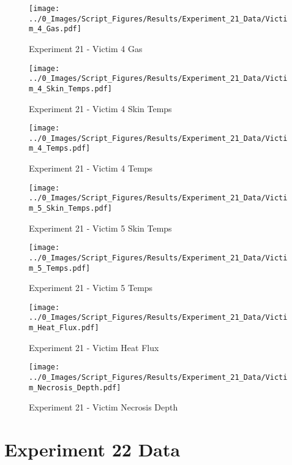 	\clearpage

	\begin{figure}[H]
		\centering
		\texttt{[image: ../0\_Images/Script\_Figures/Results/Experiment\_21\_Data/Victim\_4\_Gas.pdf]}
		\caption[]{Experiment 21 - Victim 4 Gas}
	\end{figure}
 

	\begin{figure}[H]
		\centering
		\texttt{[image: ../0\_Images/Script\_Figures/Results/Experiment\_21\_Data/Victim\_4\_Skin\_Temps.pdf]}
		\caption[]{Experiment 21 - Victim 4 Skin Temps}
	\end{figure}
 
	\clearpage

	\begin{figure}[H]
		\centering
		\texttt{[image: ../0\_Images/Script\_Figures/Results/Experiment\_21\_Data/Victim\_4\_Temps.pdf]}
		\caption[]{Experiment 21 - Victim 4 Temps}
	\end{figure}
 

	\begin{figure}[H]
		\centering
		\texttt{[image: ../0\_Images/Script\_Figures/Results/Experiment\_21\_Data/Victim\_5\_Skin\_Temps.pdf]}
		\caption[]{Experiment 21 - Victim 5 Skin Temps}
	\end{figure}
 
	\clearpage

	\begin{figure}[H]
		\centering
		\texttt{[image: ../0\_Images/Script\_Figures/Results/Experiment\_21\_Data/Victim\_5\_Temps.pdf]}
		\caption[]{Experiment 21 - Victim 5 Temps}
	\end{figure}
 

	\begin{figure}[H]
		\centering
		\texttt{[image: ../0\_Images/Script\_Figures/Results/Experiment\_21\_Data/Victim\_Heat\_Flux.pdf]}
		\caption[]{Experiment 21 - Victim Heat Flux}
	\end{figure}
 
	\clearpage

	\begin{figure}[H]
		\centering
		\texttt{[image: ../0\_Images/Script\_Figures/Results/Experiment\_21\_Data/Victim\_Necrosis\_Depth.pdf]}
		\caption[]{Experiment 21 - Victim Necrosis Depth}
	\end{figure}
 

\clearpage		\large
\section{Experiment 22 Data} \label{App:Exp22Results} 

